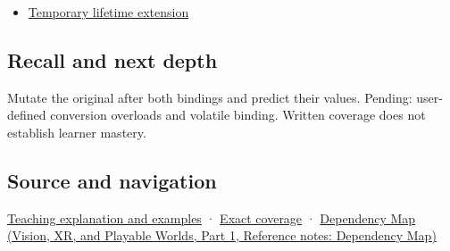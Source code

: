 \hypertarget{appendix-37856d997bb0-used-by}{}

\begin{itemize}
\tightlist
\item
  \hyperref[appendix-a978b29bbbb0]{Temporary lifetime extension}
\end{itemize}

\subsection{Recall and next depth}\label{appendix-37856d997bb0-recall-and-next-depth}

\hypertarget{appendix-37856d997bb0-recall-and-next-depth}{}

Mutate the original after both bindings and predict their values. Pending: user-defined conversion overloads and volatile binding. Written coverage does not establish learner mastery.

\subsection{Source and navigation}\label{appendix-37856d997bb0-source-and-navigation}

\hypertarget{appendix-37856d997bb0-source-and-navigation}{}

\hyperref[01-foundations-i-ch003-binding-chooses-a-referent-not-always-the-one-you-imagined]{Teaching explanation and examples} · \hyperref[appendix-fd090d982a15-m008---parts-113-126]{Exact coverage} · \href{../07-Vision-XR-and-Playable-Worlds-P01/main.pdf\#nameddest=appendix-4ad47bdd269a}{Dependency Map (Vision, XR, and Playable Worlds, Part 1, Reference notes: Dependency Map)}
